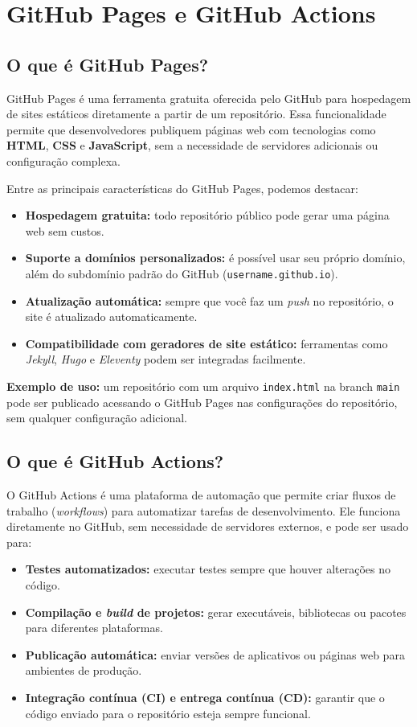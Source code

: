\chapter{GitHub Pages e GitHub Actions}

\section{O que é GitHub Pages?}
GitHub Pages é uma ferramenta gratuita oferecida pelo GitHub para hospedagem de sites estáticos diretamente a partir de um repositório. Essa funcionalidade permite que desenvolvedores publiquem páginas web com tecnologias como \textbf{HTML}, \textbf{CSS} e \textbf{JavaScript}, sem a necessidade de servidores adicionais ou configuração complexa.

Entre as principais características do GitHub Pages, podemos destacar:
\begin{itemize}
    \item \textbf{Hospedagem gratuita:} todo repositório público pode gerar uma página web sem custos.
    \item \textbf{Suporte a domínios personalizados:} é possível usar seu próprio domínio, além do subdomínio padrão do GitHub (\texttt{username.github.io}).
    \item \textbf{Atualização automática:} sempre que você faz um \textit{push} no repositório, o site é atualizado automaticamente.
    \item \textbf{Compatibilidade com geradores de site estático:} ferramentas como \textit{Jekyll}, \textit{Hugo} e \textit{Eleventy} podem ser integradas facilmente.
\end{itemize}

\textbf{Exemplo de uso:} um repositório com um arquivo \texttt{index.html} na branch \texttt{main} pode ser publicado acessando o GitHub Pages nas configurações do repositório, sem qualquer configuração adicional.

\section{O que é GitHub Actions?}
O GitHub Actions é uma plataforma de automação que permite criar fluxos de trabalho (\textit{workflows}) para automatizar tarefas de desenvolvimento. Ele funciona diretamente no GitHub, sem necessidade de servidores externos, e pode ser usado para:
\begin{itemize}
    \item \textbf{Testes automatizados:} executar testes sempre que houver alterações no código.
    \item \textbf{Compilação e \textit{build} de projetos:} gerar executáveis, bibliotecas ou pacotes para diferentes plataformas.
    \item \textbf{Publicação automática:} enviar versões de aplicativos ou páginas web para ambientes de produção.
    \item \textbf{Integração contínua (CI) e entrega contínua (CD):} garantir que o código enviado para o repositório esteja sempre funcional.
\end{itemize}

